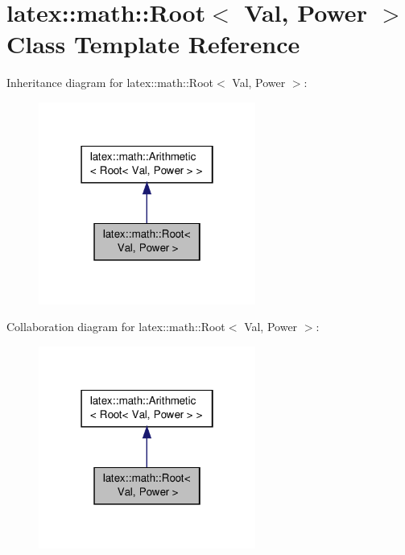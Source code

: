 \hypertarget{classlatex_1_1math_1_1Root}{\section{latex\-:\-:math\-:\-:Root$<$ Val, Power $>$ Class Template Reference}
\label{classlatex_1_1math_1_1Root}
}


Inheritance diagram for latex\-:\-:math\-:\-:Root$<$ Val, Power $>$\-:
\nopagebreak
\begin{figure}[H]
\begin{center}
\leavevmode
\includegraphics[width=202pt]{classlatex_1_1math_1_1Root__inherit__graph}
\end{center}
\end{figure}


Collaboration diagram for latex\-:\-:math\-:\-:Root$<$ Val, Power $>$\-:
\nopagebreak
\begin{figure}[H]
\begin{center}
\leavevmode
\includegraphics[width=202pt]{classlatex_1_1math_1_1Root__coll__graph}
\end{center}
\end{figure}
